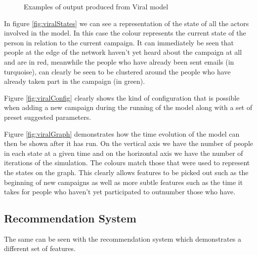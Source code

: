 \documentclass[12pt,a4paper]{article}
\begin{document}
\begin{figure}[htb]
\begin{subfigure}[b]{0.3\linewidth}
	\end{subfigure}
\caption{Examples of output produced from Viral model}
\label{fig:viral}
\end{figure}

In figure \ref{fig:viralStates} we can see a representation of the state of all the actors involved in the model. In this case the colour represents the current state of the person in relation to the current campaign. It can immediately be seen that people at the edge of the network haven't yet heard about the campaign at all and are in red, meanwhile the people who have already been sent emails (in turquoise), can clearly be seen to be clustered around the people who have already taken part in the campaign (in green).

Figure \ref{fig:viralConfig} clearly shows the kind of configuration that is possible when adding a new campaign during the running of the model along with a set of preset suggested parameters.

Figure \ref{fig:viralGraph} demonstrates how the time evolution of the model can then be shown after it has run. On the vertical axis we have the number of people in each state at a given time and on the horizontal axis we have the number of iterations of the simulation. The colours match those that were used to represent the states on the graph. This clearly allows features to be picked out such as the beginning of new campaigns as well as more subtle features such as the time it takes for people who haven't yet participated to outnumber those who have.

\subsection{Recommendation System}

The same can be seen with the recommendation system which demonstrates a different set of features.
\end{document}
